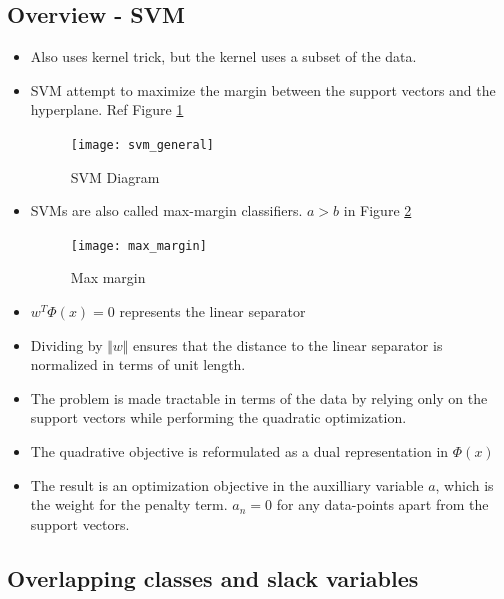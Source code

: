 \documentclass[parskip=half]{scrartcl}
\begin{document}
    \subsection{Overview - SVM} %
    \label{sub:overview_svm}

    \begin{itemize}
        \item 
        Also uses kernel trick, but the kernel uses a subset of the data.
        \item 
        SVM attempt to maximize the margin between the support vectors and the hyperplane. Ref Figure \ref{fig:svm_general}
        \begin{figure}[th]
        \centering
        \texttt{[image: svm\_general]}
        \caption{SVM Diagram}
        \label{fig:svm_general}
        \end{figure}
        \item 
        SVMs are also called max-margin classifiers. $a > b$ in Figure \ref{fig:max_margin}
        \begin{figure}[th]
        \centering
        \texttt{[image: max\_margin]}
        \caption{Max margin}
        \label{fig:max_margin}
        \end{figure}
        \item 
        $w^T \Phi(x) = 0$ represents the linear separator
        \item 
        Dividing by $\Vert w\Vert$ ensures that the distance to the linear separator is normalized in terms of unit length.
        \item 
        The problem is made tractable in terms of the data by relying only on the support vectors while performing the quadratic optimization.
        \item 
        The quadrative objective is reformulated as a dual representation in $\Phi(x)$
        \item 
        The result is an optimization objective in the auxilliary variable $a$, which is the weight for the penalty term. $a_n = 0$ for any data-points apart from the support vectors.
    \end{itemize}    

    \subsection{Overlapping classes and slack variables} %
    \label{sub:overlapping_classes_and_slack_variables}
\end{document}
